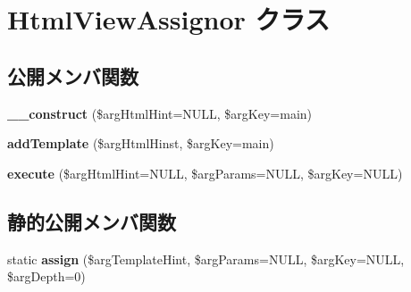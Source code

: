 \hypertarget{class_html_view_assignor}{}\section{Html\+View\+Assignor クラス}
\label{class_html_view_assignor}
\subsection*{公開メンバ関数}
\begin{DoxyCompactItemize}
\item 
\hypertarget{class_html_view_assignor_a721819771a89e1370d7767f36eca0a93}{}{\bfseries \+\_\+\+\_\+construct} (\$arg\+Html\+Hint=N\+U\+L\+L, \$arg\+Key=\textquotesingle{}main\textquotesingle{})\label{class_html_view_assignor_a721819771a89e1370d7767f36eca0a93}

\item 
\hypertarget{class_html_view_assignor_a2f2e57bda342e5571fe66349be5c8007}{}{\bfseries add\+Template} (\$arg\+Html\+Hinst, \$arg\+Key=\textquotesingle{}main\textquotesingle{})\label{class_html_view_assignor_a2f2e57bda342e5571fe66349be5c8007}

\item 
\hypertarget{class_html_view_assignor_af671e836b554934ff452805d6b1d6a54}{}{\bfseries execute} (\$arg\+Html\+Hint=N\+U\+L\+L, \$arg\+Params=N\+U\+L\+L, \$arg\+Key=N\+U\+L\+L)\label{class_html_view_assignor_af671e836b554934ff452805d6b1d6a54}

\end{DoxyCompactItemize}
\subsection*{静的公開メンバ関数}
\begin{DoxyCompactItemize}
\item 
\hypertarget{class_html_view_assignor_a436e8eb3ef6f39137ef00e6ccf2da22d}{}static {\bfseries assign} (\$arg\+Template\+Hint, \$arg\+Params=N\+U\+L\+L, \$arg\+Key=N\+U\+L\+L, \$arg\+Depth=0)\label{class_html_view_assignor_a436e8eb3ef6f39137ef00e6ccf2da22d}

\end{DoxyCompactItemize}
